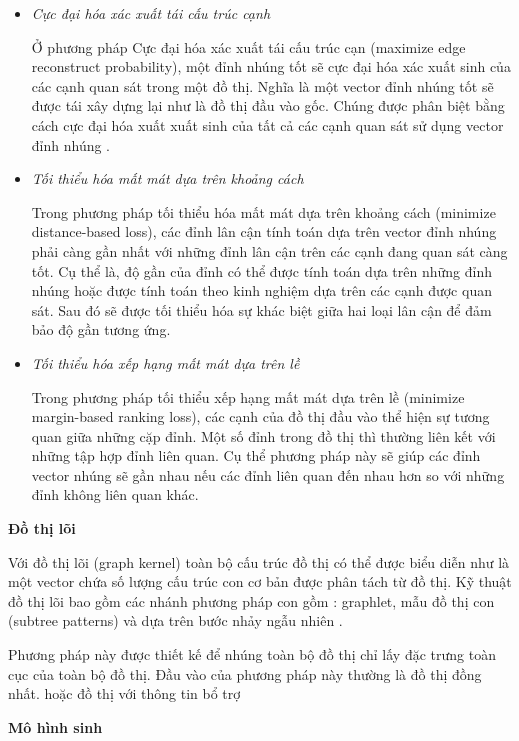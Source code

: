 \begin{itemize}
	\item \textit{Cực đại hóa xác xuất tái cấu trúc cạnh }
	
	Ở phương pháp Cực đại hóa xác xuất tái cấu trúc cạn (maximize edge reconstruct probability), một đỉnh nhúng tốt sẽ cực đại hóa xác xuất sinh của các cạnh quan sát trong một đồ thị. Nghĩa là một vector đỉnh nhúng tốt sẽ được tái xây dựng lại như là đồ thị đầu vào gốc. Chúng được phân biệt bằng cách cực đại hóa xuất xuất sinh của tất cả các cạnh quan sát sử dụng vector đỉnh nhúng .
	
	\item \textit{Tối thiểu hóa mất mát dựa trên khoảng cách}
	
	Trong phương pháp tối thiểu hóa mất mát dựa trên khoảng cách (minimize distance-based loss), các đỉnh lân cận tính toán dựa trên vector đỉnh nhúng phải càng gần nhất với những đỉnh lân cận trên các cạnh đang quan sát càng tốt.
	Cụ thể là, độ gần của đỉnh có thể được tính toán dựa trên những đỉnh nhúng hoặc được tính toán theo kinh nghiệm dựa trên các cạnh được quan sát. Sau đó sẽ được tối thiểu hóa sự khác biệt giữa hai loại lân cận để đảm bảo độ gần tương ứng.
	
	\item \textit{Tối thiểu hóa xếp hạng mất mát dựa trên lề}
	
	Trong phương pháp tối thiểu xếp hạng mất mát dựa trên lề (minimize margin-based ranking loss), các cạnh của đồ thị đầu vào thể hiện sự tương quan giữa những cặp đỉnh. Một số đỉnh trong đồ thị thì thường liên kết với những tập hợp đỉnh liên quan. Cụ thể phương pháp này sẽ giúp các đỉnh vector nhúng sẽ gần nhau nếu các đỉnh liên quan đến nhau hơn so với những đỉnh không liên quan khác.
\end{itemize}

\textbf{Đồ thị lõi}

Với đồ thị lõi (graph kernel) toàn bộ cấu trúc đồ thị có thể được biểu diễn như là một vector chứa số lượng cấu trúc con cơ bản được phân tách từ đồ thị. Kỹ thuật đồ thị lõi bao gồm các nhánh phương pháp con gồm : graphlet, mẫu đồ thị con (subtree patterns) và dựa trên bước nhảy ngẫu nhiên .

Phương pháp này được thiết kế để nhúng toàn bộ đồ thị chỉ lấy đặc trưng toàn cục của toàn bộ đồ thị. Đầu vào của phương pháp này thường là đồ thị đồng nhất. hoặc đồ thị với thông tin bổ trợ

\textbf{Mô hình sinh}

